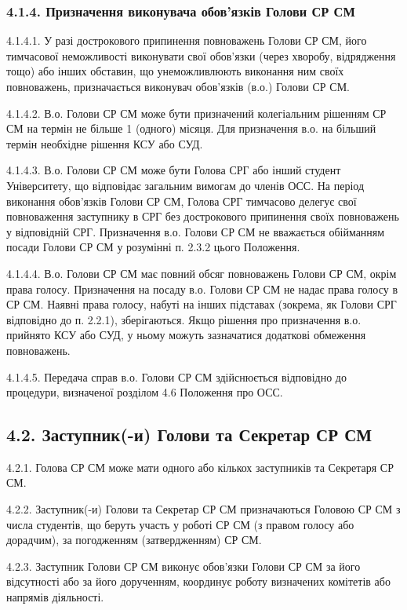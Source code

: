     \subsubsection*{4.1.4. Призначення виконувача обов'язків Голови СР СМ}
        4.1.4.1. У разі дострокового припинення повноважень Голови СР СМ, його тимчасової неможливості виконувати свої обов'язки (через хворобу, відрядження тощо) або інших обставин, що унеможливлюють виконання ним своїх повноважень, призначається виконувач обов'язків (в.о.) Голови СР СМ.

        4.1.4.2. В.о. Голови СР СМ може бути призначений колегіальним рішенням СР СМ на термін не більше 1 (одного) місяця. Для призначення в.о. на більший термін необхідне рішення КСУ або СУД.

        4.1.4.3. В.о. Голови СР СМ може бути Голова СРГ або інший студент Університету, що відповідає загальним вимогам до членів ОСС. На період виконання обов'язків Голови СР СМ, Голова СРГ тимчасово делегує свої повноваження заступнику в СРГ без дострокового припинення своїх повноважень у відповідній СРГ. Призначення в.о. Голови СР СМ не вважається обійманням посади Голови СР СМ у розумінні п. 2.3.2 цього Положення.

        4.1.4.4. В.о. Голови СР СМ має повний обсяг повноважень Голови СР СМ, окрім права голосу. Призначення на посаду в.о. Голови СР СМ не надає права голосу в СР СМ. Наявні права голосу, набуті на інших підставах (зокрема, як Голови СРГ відповідно до п. 2.2.1), зберігаються. Якщо рішення про призначення в.о. прийнято КСУ або СУД, у ньому можуть зазначатися додаткові обмеження повноважень.

        4.1.4.5. Передача справ в.о. Голови СР СМ здійснюється відповідно до процедури, визначеної розділом 4.6 Положення про ОСС.

\subsection*{4.2. Заступник(-и) Голови та Секретар СР СМ}
    4.2.1. Голова СР СМ може мати одного або кількох заступників та Секретаря СР СМ.

    4.2.2. Заступник(-и) Голови та Секретар СР СМ призначаються Головою СР СМ з числа студентів, що беруть участь у роботі СР СМ (з правом голосу або дорадчим), за погодженням (затвердженням) СР СМ.

    4.2.3. Заступник Голови СР СМ виконує обов'язки Голови СР СМ за його відсутності або за його дорученням, координує роботу визначених комітетів або напрямів діяльності.

